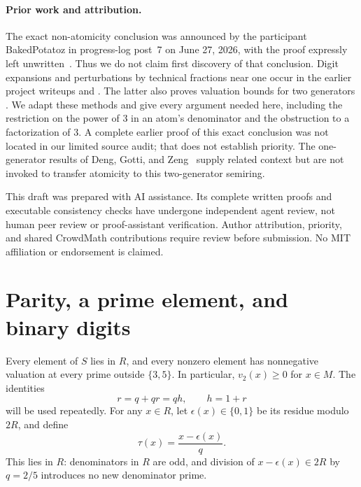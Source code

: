 \documentclass[11pt]{article}
\theoremstyle{definition}
\begin{document}
\paragraph{Prior work and attribution.}
The exact non-atomicity conclusion was announced by the participant
BakedPotatoz in progress-log post~7 on June 27, 2026, with the proof
expressly left unwritten~\cite{announcement}. Thus we do not claim first
discovery of that conclusion. Digit expansions and perturbations by
technical fractions near one occur in the earlier project writeups
\cite[Section 4.6]{progress} and \cite[Theorem 2.6]{yayyayyay}.
The latter also proves valuation bounds for two generators
\cite[Proposition 3.7]{yayyayyay}. We adapt these methods and give every
argument needed here, including the restriction on the power of $3$ in
an atom's denominator and the obstruction to a factorization of $3$.
A complete earlier proof of this exact conclusion was not located in
our limited source audit; that does not establish priority. The
one-generator results of Deng, Gotti, and Zeng~\cite{dgz} supply related
context but are not invoked to transfer atomicity to this two-generator
semiring.

This draft was prepared with AI assistance. Its complete written proofs
and executable consistency checks have undergone independent agent
review, not human peer review or proof-assistant verification. Author
attribution, priority, and shared CrowdMath contributions require review
before submission. No MIT affiliation or endorsement is claimed.

\section{Parity, a prime element, and binary digits}
Every element of $S$ lies in $R$, and every nonzero element has
nonnegative valuation at every prime outside $\{3,5\}$. In particular,
$v_2(x)\ge0$ for $x\in M$. The identities
\begin{equation}\label{eq:identities}
 r=q+qr=qh,\qquad h=1+r
\end{equation}
will be used repeatedly.
For any $x\in R$, let $\epsilon(x)\in\{0,1\}$ be its residue modulo
$2R$, and define
\[
 \tau(x)=\frac{x-\epsilon(x)}q.
\]
This lies in $R$: denominators in $R$ are odd, and division of
$x-\epsilon(x)\in2R$ by $q=2/5$ introduces no new denominator prime.
\end{document}
